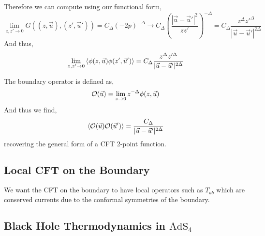 \documentclass[12pt]{extarticle}
\newcommand{\AdS}[1]{\mathrm{AdS}_{#1}}
\begin{document}
Therefore we can compute using our functional form,
\[ \lim_{z, z' \to 0} G((z, \vec{u}), (z', \vec{u}')) = C_\Delta (- 2 p)^{-\Delta} \to C_\Delta \left( \frac{|\vec{u} - \vec{u}'|^2}{z z'} \right)^{-\Delta} = C_\Delta \frac{z^\Delta z'^\Delta}{|\vec{u} - \vec{u}'|^{2 \Delta}} \]
And thus,
\[ \lim_{z, z' \to 0} \left< \phi(z, \vec{u}) \phi(z', \vec{u}') \right> = C_\Delta \frac{z^\Delta z'^\Delta}{|\vec{u} - \vec{u}'|^{2\Delta}} \]
\begin{definition}
The boundary operator is defined as,
\[ \mathcal{O}(\vec{u}) = \lim_{z \to 0} z^{-\Delta} \phi(z, \vec{u}) \]
And thus we find,
\[ \left< \mathcal{O}(\vec{u}) \mathcal{O}(\vec{u}') \right> =  \frac{C_\Delta}{|\vec{u} - \vec{u}'|^{2\Delta}} \]
recovering the general form of a CFT 2-point function.
\end{definition}

\subsection{Local CFT on the Boundary}

We want the CFT on the boundary to have local operators such as $T_{ab}$ which are conserved currents due to the conformal symmetries of the boundary. 

\subsection{Black Hole Thermodynamics in $\AdS{4}$}
\end{document}
